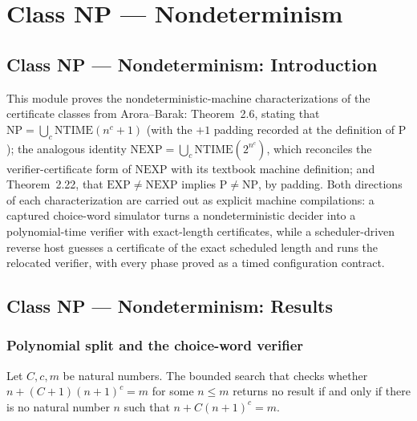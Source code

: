 \section{Class NP --- Nondeterminism}
\subsection*{Class NP --- Nondeterminism: Introduction}

This module proves the nondeterministic-machine characterizations of the
certificate classes from Arora--Barak: Theorem~2.6, stating that
$\mathrm{NP} = \bigcup_c \mathrm{NTIME}(n^c + 1)$ (with the $+1$ padding recorded at
the definition of $\mathrm{P}$); the analogous identity
$\mathrm{NEXP} = \bigcup_c \mathrm{NTIME}(2^{n^c})$, which reconciles the
verifier-certificate form of $\mathrm{NEXP}$ with its textbook machine definition;
and Theorem~2.22, that $\mathrm{EXP} \ne \mathrm{NEXP}$ implies
$\mathrm{P} \ne \mathrm{NP}$, by padding. Both directions of each characterization
are carried out as explicit machine compilations: a captured choice-word simulator
turns a nondeterministic decider into a polynomial-time verifier with exact-length
certificates, while a scheduler-driven reverse host guesses a certificate of the
exact scheduled length and runs the relocated verifier, with every phase proved as
a timed configuration contract.

\subsection*{Class NP --- Nondeterminism: Results}

\subsubsection{Polynomial split and the choice-word verifier}

\begin{lemma}
\label{Complexity.certificateSplit_none_iff}
\leanok
{}
Let $C,c,m$ be natural numbers. The bounded search that checks whether
$n+(C+1)(n+1)^c=m$ for some $n\le m$ returns no result if and only if there is no
natural number $n$ such that $n+C(n+1)^c=m$.
\end{lemma}

